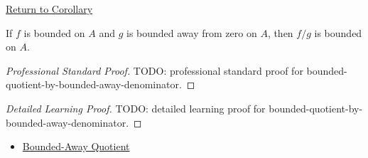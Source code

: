 \newpage
{}
\label{prf:bounded-quotient-by-bounded-away-denominator}

\begin{remark*}[Return]
\hyperref[cor:bounded-quotient-by-bounded-away-denominator]{Return to Corollary}
\end{remark*}

\begin{corollary*}
If \(f\) is bounded on \(A\) and \(g\) is bounded away from zero on \(A\),
then \(f/g\) is bounded on \(A\).
\end{corollary*}

\begin{proof}[Professional Standard Proof]
\LRAProofBodyStart
TODO: professional standard proof for bounded-quotient-by-bounded-away-denominator.
\end{proof}

\begin{proof}[Detailed Learning Proof]
\LRAProofBodyStart
TODO: detailed learning proof for bounded-quotient-by-bounded-away-denominator.
\end{proof}

\begin{remark*}
\end{remark*}

\begin{dependencies}
\begin{itemize}
  \item \hyperref[thm:bounded-away-quotient]{Bounded-Away Quotient}
\end{itemize}
\end{dependencies}

\clearpage
